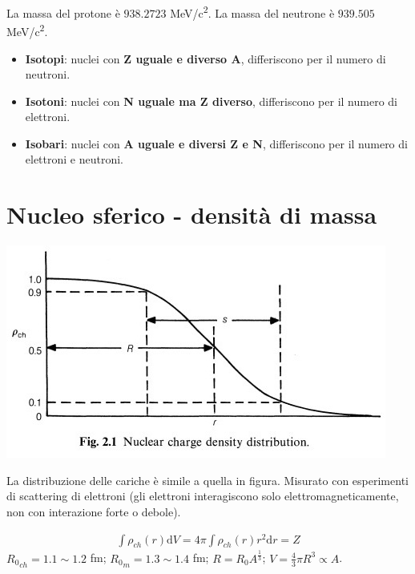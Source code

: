 \documentclass[a4paper,11pt,twoside,openany]{book}
\theoremstyle{definition}
\theoremstyle{plain}
\theoremstyle{plain}
\theoremstyle{definition}
\begin{document}
La massa del protone è $938.2723$ \si{MeV/c^2}. La massa del neutrone è $939.505$ \si{MeV/c^2}.
\begin{itemize}
\item \textbf{Isotopi}: nuclei con \textbf{Z uguale e diverso A}, differiscono per il numero di neutroni.
\item \textbf{Isotoni}: nuclei con \textbf{N uguale ma Z diverso}, differiscono per il numero di elettroni.
\item \textbf{Isobari}: nuclei con \textbf{A uguale e diversi Z e N}, differiscono per il numero di elettroni e neutroni.
\end{itemize}

\section{Nucleo sferico - densità di massa} %
\begin{center}
\includegraphics[width=\textwidth]{immagini/mass_density.jpg} %
\end{center}

La distribuzione delle cariche è simile a quella in figura. Misurato con esperimenti di scattering di elettroni (gli elettroni interagiscono solo elettromagneticamente, non con interazione forte o debole).

\begin{equation}\begin{split}
\int{\rho_{ch}\left(r\right)\textrm{d}V}=4\pi\int{\rho_{ch}\left(r\right)r^2\textrm{d}r}=Z
\end{split}\end{equation}
${R_0}_{ch}=1.1\sim 1.2$ fm; ${R_0}_m=1.3\sim 1.4$ fm; $R=R_0A^\frac{1}{3}$; $V=\frac{4}{3}\pi R^3 \propto A$.
\end{document}
